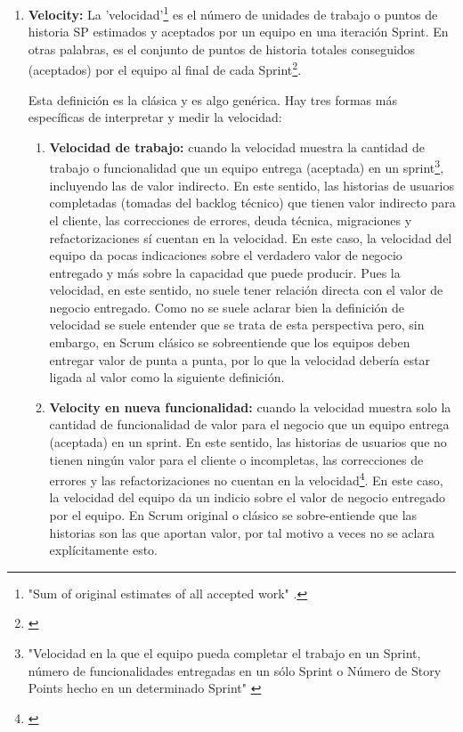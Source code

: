 \begin{enumerate}

\item {\textbf{Velocity:} La 'velocidad'\footnote{"Sum of original estimates of all accepted work" \cite{Scott-Jeff-2013}.} es el número de unidades de trabajo o puntos de historia SP estimados y aceptados por un equipo en una iteración Sprint. En otras palabras, es el conjunto de puntos de historia totales conseguidos (aceptados) por el equipo al final de cada Sprint\footnote{\cite{Jipson-Thomas-2015}}.}

Esta definición es la clásica y es algo genérica. Hay tres formas más específicas de interpretar y medir la velocidad:

  \begin{enumerate}

  \item{\textbf{Velocidad de trabajo:} cuando la velocidad muestra la cantidad de trabajo o funcionalidad que un equipo entrega (aceptada) en un sprint\footnote{"Velocidad en la que el equipo pueda completar el trabajo en un Sprint, número de funcionalidades entregadas en un sólo Sprint o Número de Story Points hecho en un determinado Sprint" \cite{SBOK-2013}}, incluyendo las de valor indirecto. En este sentido, las historias de usuarios completadas (tomadas del backlog técnico) que tienen valor indirecto para el cliente, las correcciones de errores, deuda técnica, migraciones y refactorizaciones sí cuentan en la velocidad. En este caso, la velocidad del equipo da pocas indicaciones sobre el verdadero valor de negocio entregado y más sobre la capacidad que puede producir. Pues la velocidad, en este sentido, no suele tener relación directa con el valor de negocio entregado. Como no se suele aclarar bien la definición de velocidad se suele entender que se trata de esta perspectiva pero, sin embargo, en Scrum clásico se sobreentiende que los equipos deben entregar valor de punta a punta, por lo que la velocidad debería estar ligada al valor como la siguiente definición.
  }

  \item{\textbf{Velocity en nueva funcionalidad:} cuando la velocidad muestra solo la cantidad de funcionalidad de valor para el negocio que un equipo entrega (aceptada) en un sprint. En este sentido, las historias de usuarios que no tienen ningún valor para el cliente o incompletas, las correcciones de errores y las refactorizaciones no cuentan en la velocidad\footnote{\cite{David-Koontz-2014}}. En este caso, la velocidad del equipo da un indicio sobre el valor de negocio entregado por el equipo. En Scrum original o clásico se sobre-entiende que las historias son las que aportan valor, por tal motivo a veces no se aclara explícitamente esto.
  }
  

\end{enumerate}
\end{enumerate}
